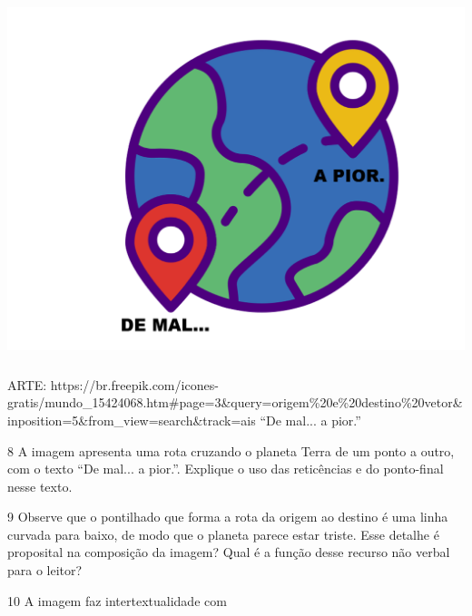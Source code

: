 {\includegraphics[width=5.90556in,height=4.43889in]{./imgSAEB_6_POR/media/image11.png}
ARTE:
https://br.freepik.com/icones-gratis/mundo\_15424068.htm\#page=3\&query=origem\%20e\%20destino\%20vetor\&inposition=5\&from\_view=search\&track=ais
``De mal... a pior.''

\num{8} A imagem apresenta uma rota cruzando o planeta Terra de um ponto
a outro, com o texto ``De mal... a pior.''. Explique o uso das
reticências e do ponto-final nesse texto.


\num{9} Observe que o pontilhado que forma a rota da origem ao destino é
uma linha curvada para baixo, de modo que o planeta parece estar triste.
Esse detalhe é proposital na composição da imagem? Qual é a função desse
recurso não verbal para o leitor?


\num{10} A imagem faz intertextualidade com

}
